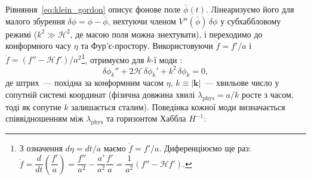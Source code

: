 Рівняння~\eqref{eq:klein_gordon} описує фонове поле $\bar{\phi}(t)$.
Лінеаризуємо його для малого збурення $\delta\phi = \phi - \bar{\phi}$,
нехтуючи членом $V''(\bar{\phi})\,\delta\phi$ у субхаббловому режимі
($k^2 \gg \mathcal{H}^2$, де масою поля можна знехтувати), і переходимо
до конформного часу $\eta$ та Фур'є-простору. Використовуючи
$\dot{f} = f'/a$ і $\ddot{f} = (f'' - \mathcal{H}f')/a^2$\footnote{%
З означення $d\eta = dt/a$ маємо $\dot{f} = f'/a$. Диференціюємо ще раз:
$\ddot{f} = \dfrac{d}{dt}\!\left(\dfrac{f'}{a}\right)
= \dfrac{f''}{a^2} - \dfrac{a'}{a^2}\dfrac{f'}{a}
= \dfrac{1}{a^2}(f'' - \mathcal{H}f')$.},
отримуємо для $k$-ї моди \cite{mukhanov_2005}:
\begin{equation}\label{eq:fourier_field}
  \delta\phi_k'' + 2\mathcal{H}\,\delta\phi_k' + k^2\,\delta\phi_k = 0,
\end{equation}
де штрих~--- похідна за конформним часом $\eta$, $k \equiv |\mathbf{k}|$~---
хвильове число у сопутній системі координат (фізична довжина хвилі
$\lambda_\mathrm{phys} = a/k$ росте з часом, тоді як сопутне $k$ залишається сталим).
Поведінка кожної моди визначається співвідношенням між $\lambda_\mathrm{phys}$
та горизонтом Хаббла $H^{-1}$:

